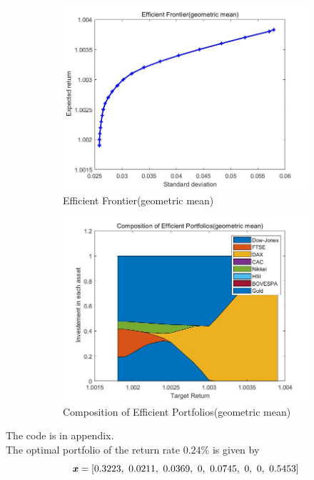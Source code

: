 \documentclass[11pt,a4paper]{article}
\begin{document}
\begin{figure}
	\centering
	\begin{subfigure}[b]{0.45\textwidth}
		\includegraphics[width=\textwidth]{ef.jpg}
		\caption{Efficient Frontier(geometric mean)}
		\label{fig:visual_smap_o}
	\end{subfigure}
	\begin{subfigure}[b]{0.45\textwidth}
		\includegraphics[width=\textwidth]{com.jpg}
		\caption{Composition of Efficient Portfolios(geometric mean)}
		\label{fig:visual_smap_k}
	\end{subfigure}
	
	\caption{}
	\label{fig:visual_smap}
\end{figure}
The code is in appendix.\\
The optimal portfolio of the return rate $0.24\%$ is given by
$$\textbf{\textit{x}}=[0.3223, \   0.0211,   \ 0.0369, \   0, \   0.0745,  \  0,\    0, \   0.5453]$$
\end{document}
